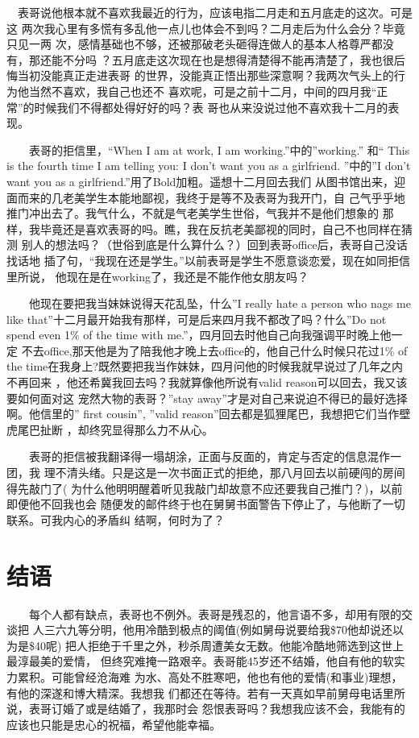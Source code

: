 \documentclass[12pt]{book}
\begin{document}
  　表哥说他根本就不喜欢我最近的行为，应该电指二月走和五月底走的这次。可是这
两次我心里有多慌有多乱他一点儿也体会不到吗？二月走后为什么会分？毕竟只见一两
次，感情基础也不够，还被那破老头砸得连做人的基本人格尊严都没有，那还能不分吗
？五月底走这次现在也是想得清楚得不能再清楚了，我也很后悔当初没能真正走进表哥
的世界，没能真正悟出那些深意啊？我两次气头上的行为他当然不喜欢，我自己也还不
喜欢呢，可是之前十二月，中间的四月我“正常”的时候我们不得都处得好好的吗？表
哥也从来没说过他不喜欢我十二月的表现。

　　表哥的拒信里，“When I am at work, I am working.”中的”working.” 和“
This is the fourth time I am telling you: I don’t want you as a girlfriend.
”中的”I don’t want you as a girlfriend.”用了Bold加粗。遥想十二月回去我们
从图书馆出来，迎面而来的几老美学生本能地鄙视，我终于是等不及表哥为我开门，自
己气乎乎地推门冲出去了。我气什么，不就是气老美学生世俗，气我并不是他们想象的
那样，我毕竟还是喜欢表哥的吗。瞧，我在反抗老美鄙视的同时，自己不也同样在猜测
别人的想法吗？（世俗到底是什么算什么？）回到表哥office后，表哥自己没话找话地
插了句，“我现在还是学生。”以前表哥是学生不愿意谈恋爱，现在如同拒信里所说，
他现在是在working了，我还是不能作他女朋友吗？

　　他现在要把我当妹妹说得天花乱坠，什么”I really hate a person who nags me
like that”十二月最开始我有那样，可是后来四月我不都改了吗？什么”Do not 
spend even 1\% of the time with me.”，四月回去时他自己向我强调平时晚上他一定
不去office,那天他是为了陪我他才晚上去office的，他自己什么时候只花过1\% of the
time在我身上?既然要把我当作妹妹，四月问他的时候我就早说过了几年之内不再回来
，他还希冀我回去吗？我就算像他所说有valid reason可以回去，我又该要如何面对这
宠然大物的表哥？”stay away”才是对自己来说迫不得已的最好选择啊。他信里的”
first cousin”, ”valid reason”回去都是狐狸尾巴，我想把它们当作壁虎尾巴扯断
，却终究显得那么力不从心。

　　表哥的拒信被我翻译得一塌胡涂，正面与反面的，肯定与否定的信息混作一团，我
理不清头绪。只是这是一次书面正式的拒绝，那八月回去以前硬闯的房间得先敲门了(
为什么他明明醒着听见我敲门却故意不应还要我自己推门？)，以前即便他不回我也会
随便发的邮件终于也在舅舅书面警告下停止了，与他断了一切联系。可我内心的矛盾纠
结啊，何时为了？
\section{结语}
\label{sec-8-37}

　　每个人都有缺点，表哥也不例外。表哥是残忍的，他言语不多，却用有限的交谈把
人三六九等分明，他用冷酷到极点的阈值(例如舅母说要给我\$70他却说还以为是\$40呢)
把人拒绝于千里之外，秒杀周遭美女无数。他能冷酷地筛选到这世上最淳最美的爱情，
但终究难掩一路艰辛。表哥能45岁还不结婚，他自有他的软实力累积。可能曾经沧海难
为水、高处不胜寒吧，他也有他的爱情(和事业)理想，有他的深遂和博大精深。我想我
们都还在等待。若有一天真如早前舅母电话里所说，表哥订婚了或是结婚了，我那时会
怨恨表哥吗？我想我应该不会，我能有的应该也只能是忠心的祝福，希望他能幸福。
\end{document}
